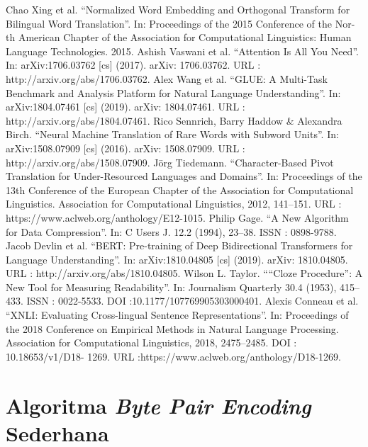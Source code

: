 \documentclass[conference]{IEEEtran}
\begin{document}
\begin{thebibliography}{00}
 Chao Xing et al. “Normalized Word Embedding and Orthogonal Transform for Bilingual Word Translation”. In: Proceedings of the 2015 Conference of the Nor- th American Chapter of the Association for Computational Linguistics: Human Language Technologies. 2015.
 Ashish Vaswani et al. “Attention Is All You Need”. In: arXiv:1706.03762 [cs] (2017). arXiv: 1706.03762. URL : http://arxiv.org/abs/1706.03762.
 Alex Wang et al. “GLUE: A Multi-Task Benchmark and Analysis Platform for Natural Language Understanding”. In: arXiv:1804.07461 [cs] (2019). arXiv: 1804.07461. URL : http://arxiv.org/abs/1804.07461.
 Rico Sennrich, Barry Haddow \& Alexandra Birch. “Neural Machine Translation of Rare Words with Subword Units”. In: arXiv:1508.07909 [cs] (2016). arXiv: 1508.07909. URL : http://arxiv.org/abs/1508.07909.
 Jörg Tiedemann. “Character-Based Pivot Translation for Under-Resourced Languages and Domains”. In: Proceedings of the 13th Conference of the European Chapter of the Association for Computational Linguistics. Association for Computational Linguistics, 2012, 141–151. URL : https://www.aclweb.org/anthology/E12-1015.
 Philip Gage. “A New Algorithm for Data Compression”. In: C Users J. 12.2 (1994), 23–38. ISSN : 0898-9788.
 Jacob Devlin et al. “BERT: Pre-training of Deep Bidirectional Transformers for Language Understanding”. In: arXiv:1810.04805 [cs] (2019). arXiv: 1810.04805. URL : http://arxiv.org/abs/1810.04805.
 Wilson L. Taylor. ““Cloze Procedure”: A New Tool for Measuring Readability”. In: Journalism Quarterly 30.4 (1953), 415–433. ISSN : 0022-5533. DOI :10.1177/107769905303000401.
 Alexis Conneau et al. “XNLI: Evaluating Cross-lingual Sentence Representations”. In: Proceedings of the 2018 Conference on Empirical Methods in Natural Language Processing. Association for Computational Linguistics, 2018, 2475–2485. DOI : 10.18653/v1/D18- 1269. URL :https://www.aclweb.org/anthology/D18-1269.
\end{thebibliography}

\clearpage
\appendices
	\section{Algoritma \textit{Byte Pair Encoding} Sederhana}
	\label{appendix:simple_bpe_algorithm}
\end{document}
